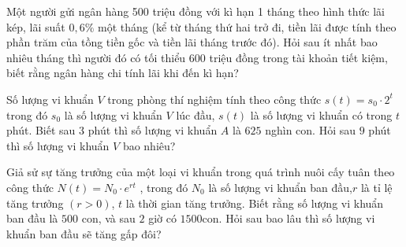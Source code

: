 \begin{bt}%
	Một người gửi ngân hàng 500 triệu đồng với kì hạn 1 tháng theo hình thức lãi kép, lãi suất  $0,6\%$ một tháng (kể từ tháng thứ hai trở đi, tiền lãi được tính theo phần trăm của tồng tiền gốc và tiền lãi tháng trước đó). Hỏi sau ít nhất bao nhiêu tháng thì người đó có tối thiểu 600 triệu đồng trong tài khoản tiết kiệm, biết rằng ngân hàng chi tính lãi khi đến kì hạn?
\end{bt}

\begin{bt}%
	Số lượng vi khuẩn $V$ trong phòng thí nghiệm tính theo công thức $s(t)=s_0\cdot 2^t$ trong đó $s_0$ là số lượng vi khuẩn $V$ lúc đầu, $s(t)$ là số lượng vi khuẩn có trong $t$ phút. Biết sau 3 phút thì số lượng  vi khuẩn $A$ là $625$ nghìn con. Hỏi sau $9$ phút thì số lượng vi khuẩn $V$ bao nhiêu?
\end{bt}

\begin{bt}%
	Giả sử sự tăng trưởng của một loại vi khuẩn trong quá trình nuôi cấy tuân theo công thức $ N(t) = N_{0}\cdot e^{rt} $ , trong đó $ N_{0} $ là số lượng vi khuẩn ban đầu,$ r $ là tỉ lệ tăng trưởng $ (r > 0) $, $ t $ là thời gian tăng trưởng. Biết rằng số lượng vi khuẩn ban đầu là $ 500 $ con, và sau $ 2 $ giờ có $ 1500 $con. Hỏi sau bao lâu thì số lượng vi khuẩn ban đầu sẽ tăng  gấp đôi?
\end{bt}

